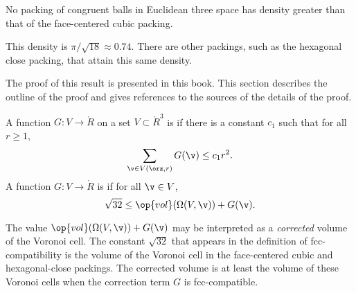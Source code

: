 \begin{theorem} 
\label{theorem:kepler}   No packing of congruent balls in
Euclidean three space has density greater than that of the
face-centered cubic packing.
\end{theorem}

\begin{remark}
This density is $\pi/\sqrt{18}\approx 0.74.$  There are other
packings, such as the hexagonal close packing, that attain this
same density.
\end{remark}

The proof of this result is presented in this book. This section
describes the outline of the proof and gives references to
the sources of the details of the proof.



\begin{definition}\label{def:negligible} 
A function $G:V\to \ring{R}$ on a set $V\subset\ring{R}^3$
is 
if there is a constant $c_1$ such that for all $r\ge1$,
\begin{displaymath}\sum_{\v\in V(\orz,r)} G(\v) \le c_1
r^2.\end{displaymath}
A function $G: V\to\ring{R}$ is
if for all $\v\in V$, 
\begin{displaymath}\sqrt{32}\le \op{vol}(\Omega(V,\v)) +
G(\v).\end{displaymath}
%
%
%
\end{definition}


\begin{remark}
The value $\op{vol}(\Omega(V,\v)) + G(\v)$ may be interpreted as a
{\it corrected\/} volume of the Voronoi cell. The constant
$\sqrt{32}$ that appears in the definition of fcc-compatibility is
the volume of the Voronoi cell in the face-centered cubic and
hexagonal-close packings.  The corrected volume is at least the
volume of these Voronoi cells when the correction term $G$ is
fcc-compatible.  %
\end{remark}




